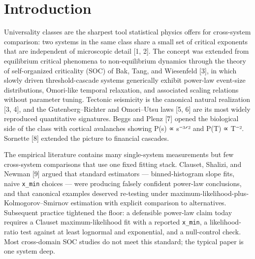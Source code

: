 \documentclass[
  11pt]{article}
\begin{document}
\begin{abstract}
raw-tail test: in particular, for S\&P 500 the raw-tail likelihood ratio
favors lognormal (R = −6.12), and the SOC verdict for that system rests
on exponent-band agreement (α = 2.998 vs the canonical 3.0) rather than
on rejecting the lognormal. (ii) The pipeline is constructed to detect
\emph{endogenous} threshold-cascade signatures and --- as is a known
property of SOC threshold-cascade methods --- is not expected to flag
externally driven crises (Phase 5 validates only the null-rejection
direction). (iii) The project\textquotesingle s downstream cross-domain
\emph{predictions} (Layer 4) remain unverified --- their target data has
not been collected, so we can give only prior-based credible intervals,
not frequentist confidence intervals on observed data. Within those
limits, the joint result is an internally consistent, single-pipeline
cross-domain test of self-organized-criticality universality across
geophysics, equity finance, decentralized finance, and neuroscience.

\begin{center}\rule{0.5\linewidth}{0.5pt}\end{center}
\end{abstract}

\section{Introduction}\label{introduction}

Universality classes are the sharpest tool statistical physics offers
for cross-system comparison: two systems in the same class share a small
set of critical exponents that are independent of microscopic detail
{[}1, 2{]}. The concept was extended from equilibrium critical phenomena
to non-equilibrium dynamics through the theory of self-organized
criticality (SOC) of Bak, Tang, and Wiesenfeld {[}3{]}, in which slowly
driven threshold-cascade systems generically exhibit power-law
event-size distributions, Omori-like temporal relaxation, and associated
scaling relations without parameter tuning. Tectonic seismicity is the
canonical natural realization {[}3, 4{]}, and the Gutenberg--Richter and
Omori--Utsu laws {[}5, 6{]} are its most widely reproduced quantitative
signatures. Beggs and Plenz {[}7{]} opened the biological side of the
class with cortical avalanches showing P(s) ∝ s⁻³ᐟ² and P(T) ∝ T⁻².
Sornette {[}8{]} extended the picture to financial cascades.

The empirical literature contains many single-system measurements but
few cross-system comparisons that use one fixed fitting stack. Clauset,
Shalizi, and Newman {[}9{]} argued that standard estimators ---
binned-histogram slope fits, naive \texttt{x\_min} choices --- were
producing falsely confident power-law conclusions, and that canonical
examples deserved re-testing under
maximum-likelihood-plus-Kolmogorov--Smirnov estimation with explicit
comparison to alternatives. Subsequent practice tightened the floor: a
defensible power-law claim today requires a Clauset maximum-likelihood
fit with a reported \texttt{x\_min}, a likelihood-ratio test against at
least lognormal and exponential, and a null-control check. Most
cross-domain SOC studies do not meet this standard; the typical paper is
one system deep.
\end{document}
